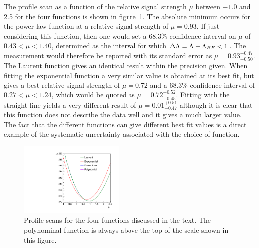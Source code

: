 The profile scan as a function of the relative signal strength $\mu$
between $-1.0$ and 2.5
for the four functions is shown in
figure~\ref{fig:functions:profiles}.
The absolute minimum occurs for the power law function at a relative signal 
strength of $\mu = 0.93$. If just considering this function,
then one would set a 68.3\% confidence interval on $\mu$ of  
$0.43 < \mu < 1.40 $, determined as the interval for which $\Delta{\rm \ensuremath{\Lambda}} = \Lambda - \Lambda_{BF} < 1$. 
The measurement would therefore be reported with its standard error as $\mu=0.93^{+0.47}_{-0.50}$. The Laurent function gives an identical result within the precision given.
When fitting the exponential function a very similar \nll value is obtained
at its best fit, but gives a best relative signal strength of $\mu = 0.72$
and a 68.3\% confidence interval of
$0.27 < \mu < 1.24 $, which would be quoted as $\mu = 0.72^{+0.52}_{-0.45}$.
Fitting with the straight line yields a very different result of 
$\mu = 0.01^{+0.51}_{-0.47}$ 
although it is clear that this function does not describe the data well and it
gives a much larger \nll value.
The fact that the different functions can give different best fit values
is a direct example of the systematic uncertainty associated
with the choice of function.
%
\begin{figure}[tbp]
\centering
\includegraphics[width=0.45\textwidth]{functions/Profiles.pdf}
\caption{Profile \nll scans for the four functions discussed in the text.
The polynominal function is always above the top of the \nll scale shown in this
figure. }
\label{fig:functions:profiles}
\end{figure}


